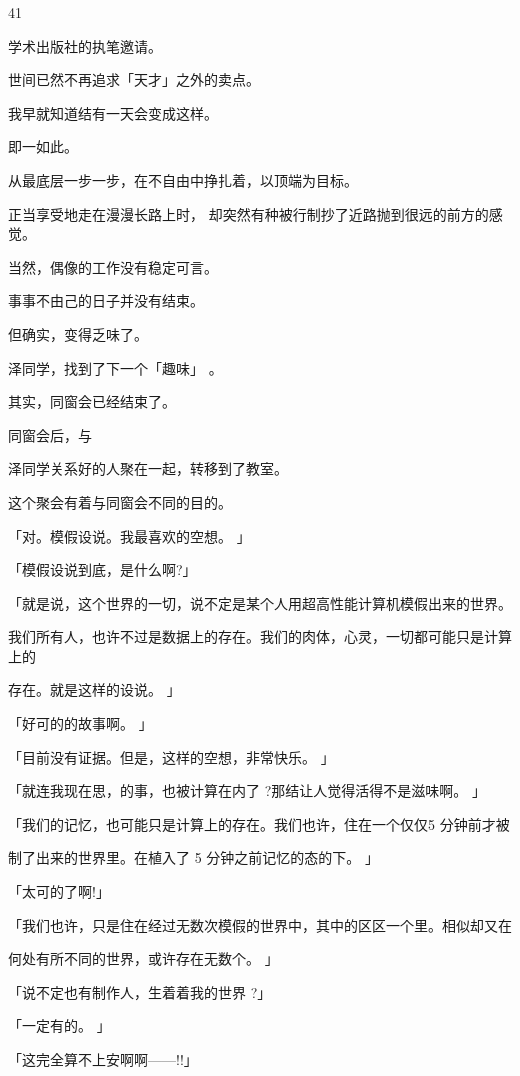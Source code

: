 41\par
学术出版社的执笔邀请。\par
世间已然不再追求「天才」之外的卖点。\par
我早就知道结有一天会变成这样。\par
即一如此。\par
从最底层一步一步，在不自由中挣扎着，以顶端为目标。\par
正当享受地走在漫漫长路上时， 却突然有种被行制抄了近路抛到很远的前方的感觉。\par
当然，偶像的工作没有稳定可言。\par
事事不由己的日子并没有结束。\par
但确实，变得乏味了。\par
泽同学，找到了下一个「趣味」 。\par
其实，同窗会已经结束了。\par
同窗会后，与\par
泽同学关系好的人聚在一起，转移到了教室。\par
这个聚会有着与同窗会不同的目的。\par
「对。模假设说。我最喜欢的空想。 」\par
「模假设说到底，是什么啊?」\par
「就是说，这个世界的一切，说不定是某个人用超高性能计算机模假出来的世界。\par
我们所有人，也许不过是数据上的存在。我们的肉体，心灵，一切都可能只是计算上的\par
存在。就是这样的设说。 」\par
「好可的的故事啊。 」\par
「目前没有证据。但是，这样的空想，非常快乐。 」\par
「就连我现在思，的事，也被计算在内了 ?那结让人觉得活得不是滋味啊。 」\par
「我们的记忆，也可能只是计算上的存在。我们也许，住在一个仅仅5 分钟前才被\par
制了出来的世界里。在植入了 5 分钟之前记忆的态的下。 」\par
「太可的了啊!」\par
「我们也许，只是住在经过无数次模假的世界中，其中的区区一个里。相似却又在\par
何处有所不同的世界，或许存在无数个。 」\par
「说不定也有制作人，生着着我的世界 ?」\par
「一定有的。 」\par
「这完全算不上安啊啊——!!」\par

